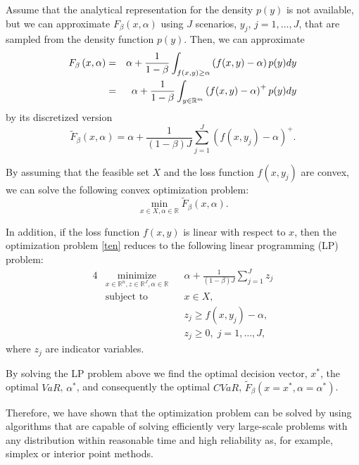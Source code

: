 \documentclass[a4paper,10pt]{article}
\begin{document}
 Assume that the analytical representation for the density $p(y)$ is not available, but we can approximate $F_{\beta }\left( x,\alpha \right) $ using $J$ scenarios, $y_{j}$, $j=1,\ldots,J$, that are sampled from the density function $p(y)$. Then, we can approximate
\begin{eqnarray}
F_{\beta }\left( x,\alpha \right) &=&\alpha +\frac{1}{1-\beta }%
\int_{f(x,y)\geq \alpha }\left( f(x,y)-\alpha \right) p(y)dy  \notag \\
&=&\alpha +\frac{1}{1-\beta }\int_{y\in	\mathbb{R}^{m}}\left( f(x,y)-\alpha \right)^{+}p(y)dy  \label{fb}
\end{eqnarray}%
by its discretized version
\begin{equation*}
\widetilde{F}_{\beta }\left( x,\alpha \right) =\alpha +\frac{1}{\left(1-\beta \right) J}\sum_{j=1}^{J}\left( f(x,y_{j})-\alpha \right)^{+}.
\end{equation*}%

By assuming that the feasible set $X$ and the loss function $f(x,y_{j})$ are convex, we can solve the following convex optimization problem:
\begin{equation}
\underset{x\in X,\alpha \in	\mathbb{R}}{\min }\widetilde{F}_{\beta }\left( x,\alpha \right).  \label{ten}
\end{equation}

In addition, if the loss function $f(x,y)$ is linear with respect to $x$, then the optimization problem \eqref{ten} reduces to the following linear programming (LP) problem:
\begin{alignat}{4}
& \underset{x \in \mathbb{R}^{n},z\in 	\mathbb{R}^{J},\alpha \in \mathbb{R}}{\text{minimize}}
& & \alpha +\frac{1}{\left( 1-\beta \right)  J}\sum_{j=1}^{J}z_{j}
\\ 
& \text{subject to} 
& & x\in X,\\
&&& z_{j}\geq f(x,y_{j})-\alpha , \\
&&& z_{j}\geq 0, \; j = 1, \ldots, J,
\end{alignat}
where $z_{j}$ are indicator variables. 

By solving the LP problem above we find the optimal decision vector, $x^{\ast }$, the optimal $VaR$, $\alpha^{\ast }$, and consequently the optimal $CVaR$, $\widetilde{F}_{\beta}\left( x=x^{\ast },\alpha=\alpha ^{\ast }\right) $.

Therefore, we have shown that the optimization problem can be solved by using algorithms that are capable of solving efficiently very large-scale problems with any distribution within reasonable time and high reliability as, for example, simplex or interior point methods.
\end{document}
